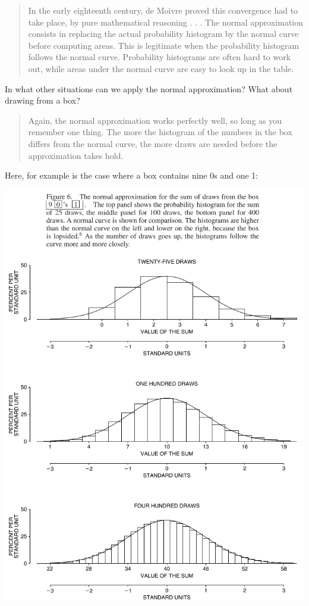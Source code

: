 \documentclass[
]{book}
\begin{document}
\begin{quote}
In the early eighteenth century, de Moivre proved this convergence had to take place, by pure mathematical reasoning . . . The normal approximation consists in replacing the actual probability histogram by the normal curve before computing areas. This is legitimate when the probability histogram follows the normal curve. Probability histograms are often hard to work out, while areas under the normal curve are easy to look up in the table.
\end{quote}

In what other situations can we apply the normal approximation? What about drawing from a box?

\begin{quote}
Again, the normal approximation works perfectly well, so long as you remember one thing. The more the histogram of the numbers in the box differs from the normal curve, the more draws are needed before the approximation takes hold.
\end{quote}

Here, for example is the case where a box contains nine 0s and one 1:

\includegraphics{images/Ch18Img05.png}
\end{document}
